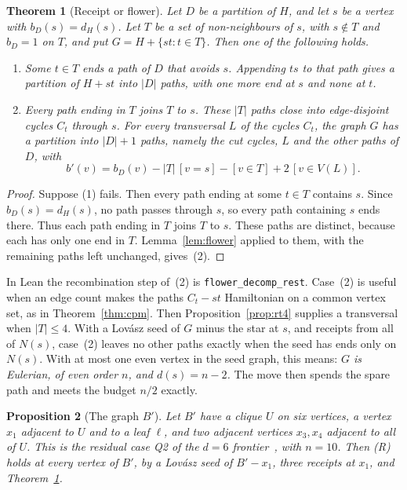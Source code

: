 \documentclass[11pt]{amsart}
\newtheorem{theorem}{Theorem}
\newtheorem{proposition}[theorem]{Proposition}
\theoremstyle{definition}
\begin{document}
\begin{theorem}[Receipt or flower]\label{thm:receiptflower}
Let $D$ be a partition of $H$, and let $s$ be a vertex with $b_D(s)=d_H(s)$. Let $T$ be a set of
non-neighbours of $s$, with $s\notin T$ and $b_D=1$ on $T$, and put $G=H+\{st:t\in T\}$. Then one of the following
holds.
\begin{enumerate}
\item Some $t\in T$ ends a path of $D$ that avoids $s$. Appending $ts$ to that path gives a partition
of $H+st$ into $|D|$ paths, with one more end at $s$ and none at $t$.
\item Every path ending in $T$ joins $T$ to $s$. These $|T|$ paths close into edge-disjoint cycles
$C_t$ through $s$. For every transversal $L$ of the cycles $C_t$, the graph $G$ has a partition into
$|D|+1$ paths, namely the cut cycles, $L$ and the other paths of $D$, with
\[
b'(v)=b_D(v)-|T|\,[v=s]-[v\in T]+2\,[v\in V(L)].
\]
\end{enumerate}
\end{theorem}

\begin{proof}
Suppose (1) fails. Then every path ending at some $t\in T$ contains $s$. Since $b_D(s)=d_H(s)$, no
path passes through $s$, so every path containing $s$ ends there. Thus each path ending in $T$
joins $T$ to $s$. These paths are distinct, because each has only one end in $T$. Lemma~\ref{lem:flower}
applied to them, with the remaining paths left unchanged, gives~(2).
\end{proof}

{\sloppy In Lean the recombination step of~(2) is \texttt{flower\_decomp\_rest}. Case~(2) is useful
when an edge count makes the paths $C_t-st$ Hamiltonian on a common vertex set, as in
Theorem~\ref{thm:cpm}. Then Proposition~\ref{prop:rt4} supplies a transversal when $|T|\le4$. With a
Lov\'asz seed of $G$ minus the star at $s$, and receipts from all of $N(s)$, case~(2) leaves no
other paths exactly when the seed has ends only on $N(s)$. With at most one even vertex in the seed
graph, this means: \emph{$G$ is Eulerian, of even order $n$, and $d(s)=n-2$.} The move then spends
the spare path and meets the budget $n/2$ exactly.\par}

\begin{proposition}[The graph $B'$]\label{prop:Bprime}
Let $B'$ have a clique $U$ on six vertices, a vertex $x_1$ adjacent to $U$ and to a leaf $\ell$, and
two adjacent vertices $x_3,x_4$ adjacent to all of $U$. This is the residual case Q2 of the $d=6$
frontier~\cite[\S5]{MM}, with $n=10$. Then (R) holds at every vertex of $B'$, by a Lov\'asz seed
of $B'-x_1$, three receipts at $x_1$, and Theorem~\ref{thm:receiptflower}.
\end{proposition}
\end{document}
